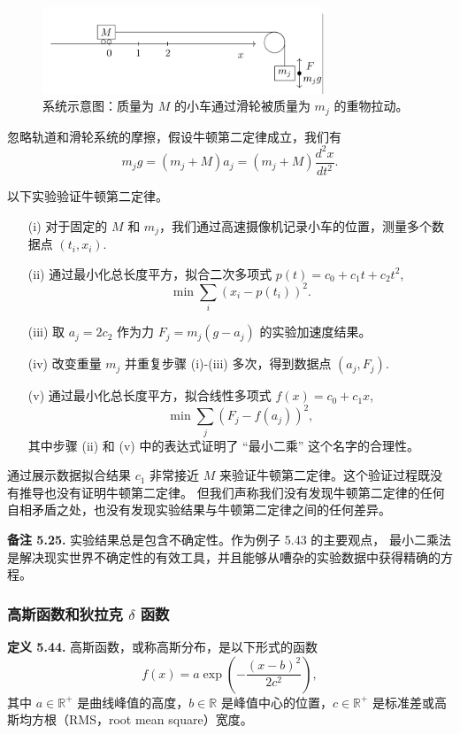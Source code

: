 \documentclass[a4paper]{ctexart}
\begin{document}
{\begin{figure}[h]
  \centering
  \includegraphics[width=0.75\textwidth]{images/cart_pulley_system.png}
  \caption{系统示意图：质量为 $M$ 的小车通过滑轮被质量为 $m_j$ 的重物拉动。}
\end{figure}
  
忽略轨道和滑轮系统的摩擦，假设牛顿第二定律成立，我们有
\[ 
  m_j g = (m_j + M) a_j = (m_j + M) \frac{d^2x}{dt^2}. 
\]
  
以下实验验证牛顿第二定律。
\begin{itemize}
  \item[(i)] 对于固定的 $M$ 和 $m_j$，我们通过高速摄像机记录小车的位置，测量多个数据点 $(t_i, x_i)$.
  \item[(ii)] 通过最小化总长度平方，拟合二次多项式 $p(t) = c_0 + c_1 t + c_2 t^2$,
  \[ 
    \min \sum_i (x_i - p(t_i))^2. 
  \]
  \item[(iii)] 取 $a_j = 2c_2$ 作为力 $F_j = m_j(g - a_j)$ 的实验加速度结果。
  \item[(iv)] 改变重量 $m_j$ 并重复步骤 (i)-(iii) 多次，得到数据点 $(a_j, F_j)$.
  \item[(v)] 通过最小化总长度平方，拟合线性多项式 $f(x) = c_0 + c_1 x$, 
  \[ 
    \min \sum_j (F_j - f(a_j))^2, 
  \]
  其中步骤 (ii) 和 (v) 中的表达式证明了 ``最小二乘'' 这个名字的合理性。
\end{itemize}  
  
通过展示数据拟合结果 $c_1$ 非常接近 $M$ 来验证牛顿第二定律。这个验证过程既没有推导也没有证明牛顿第二定律。
但我们声称我们没有发现牛顿第二定律的任何自相矛盾之处，也没有发现实验结果与牛顿第二定律之间的任何差异。

\noindent \textbf{备注 5.25.} 实验结果总是包含不确定性。作为例子 5.43 的主要观点，
最小二乘法是解决现实世界不确定性的有效工具，并且能够从嘈杂的实验数据中获得精确的方程。

\subsubsection{高斯函数和狄拉克 $\delta$ 函数}

\noindent \textbf{定义 5.44.} 高斯函数，或称高斯分布，是以下形式的函数
\[ 
  f(x) = a \exp\left(-\frac{(x-b)^2}{2c^2}\right), \tag{5.42}
\]
其中 $a \in \mathbb{R}^+$ 是曲线峰值的高度，$b \in \mathbb{R}$ 是峰值中心的位置，$c \in \mathbb{R}^+$ 
是标准差或高斯均方根（RMS，root mean square）宽度。

}
\end{document}
